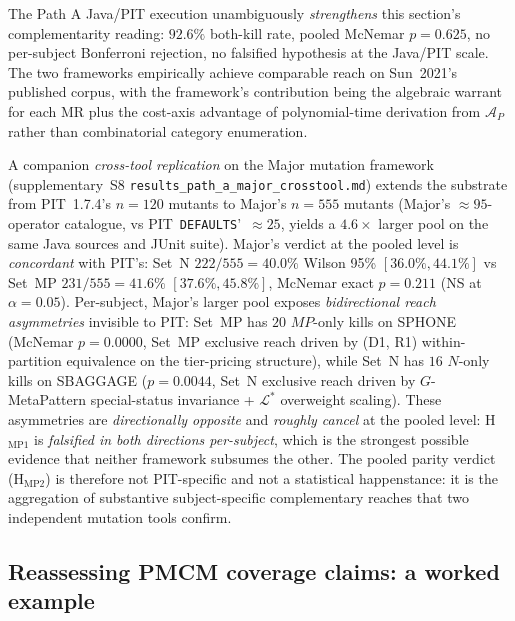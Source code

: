 \documentclass[acmsmall,screen,review]{acmart}
\begin{document}
The Path A Java/PIT execution unambiguously \emph{strengthens} this
section's complementarity reading: $92.6\%$ both-kill rate, pooled
McNemar $p = 0.625$, no per-subject Bonferroni rejection, no
falsified hypothesis at the Java/PIT scale. The two frameworks
empirically achieve comparable reach on Sun~2021's published
corpus, with the framework's contribution being the algebraic
warrant for each MR plus the cost-axis advantage of polynomial-time
derivation from $\mathcal{A}_P$ rather than combinatorial category
enumeration.

A companion \emph{cross-tool replication} on the Major mutation framework
(supplementary~S8 \texttt{results\_path\_a\_major\_crosstool.md}) extends the
substrate from PIT~1.7.4's $n = 120$ mutants to Major's $n = 555$ mutants
(Major's $\approx 95$-operator catalogue, vs PIT~\texttt{DEFAULTS}'~$\approx 25$,
yields a $4.6\times$ larger pool on the same Java sources and JUnit suite).
Major's verdict at the pooled level is \emph{concordant} with PIT's:
Set~N $222/555 = 40.0\%$ Wilson 95\% $[36.0\%, 44.1\%]$ vs Set~MP
$231/555 = 41.6\%$ $[37.6\%, 45.8\%]$, McNemar exact $p = 0.211$ (NS at
$\alpha = 0.05$). Per-subject, Major's larger pool exposes
\emph{bidirectional reach asymmetries} invisible to PIT: Set~MP has
$20$ $MP$-only kills on SPHONE (McNemar $p = 0.0000$, Set~MP exclusive
reach driven by (D1, R1) within-partition equivalence on the tier-pricing
structure), while Set~N has $16$ $N$-only kills on SBAGGAGE
($p = 0.0044$, Set~N exclusive reach driven by $G$-MetaPattern special-status
invariance + $\mathcal{L}^{*}$ overweight scaling). These asymmetries are
\emph{directionally opposite} and \emph{roughly cancel} at the pooled
level: H$_{\mathrm{MP1}}$ is \emph{falsified in both directions per-subject},
which is the strongest possible evidence that neither framework subsumes
the other. The pooled parity verdict (H$_{\mathrm{MP2}}$) is therefore not
PIT-specific and not a statistical happenstance: it is the aggregation of
substantive subject-specific complementary reaches that two independent
mutation tools confirm.

\subsection{Reassessing PMCM coverage claims: a worked example}
\label{subsec:pmcm-worked}
\end{document}
